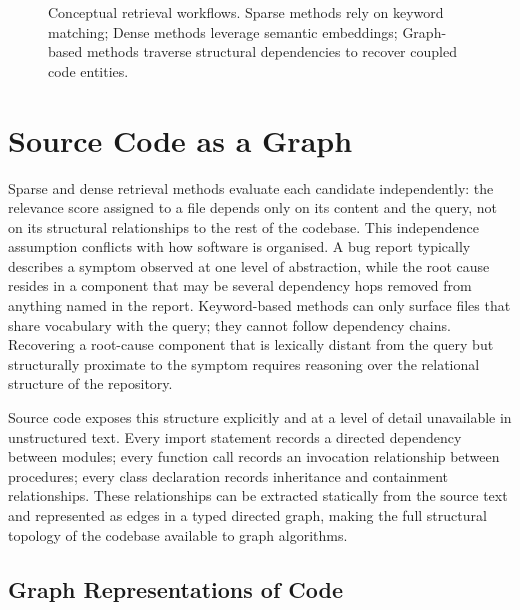 \begin{figure}[H]
    \caption{Conceptual retrieval workflows. Sparse methods rely on keyword matching; Dense methods leverage semantic embeddings; Graph-based methods traverse structural dependencies to recover coupled code entities.}
    \label{fig:retrieval-flow}
\end{figure}

\section{Source Code as a Graph}
\label{sec:code-as-graph}

Sparse and dense retrieval methods evaluate each candidate independently: the relevance
score assigned to a file depends only on its content and the query, not on its structural
relationships to the rest of the codebase.
This independence assumption conflicts with how software is organised.
A bug report typically describes a symptom observed at one level of abstraction, while
the root cause resides in a component that may be several dependency hops removed from
anything named in the report.
Keyword-based methods can only surface files that share vocabulary with the query;
they cannot follow dependency chains.
Recovering a root-cause component that is lexically distant from the query but
structurally proximate to the symptom requires reasoning over the relational structure
of the repository.

Source code exposes this structure explicitly and at a level of detail unavailable in
unstructured text.
Every import statement records a directed dependency between modules; every function
call records an invocation relationship between procedures; every class declaration
records inheritance and containment relationships.
These relationships can be extracted statically from the source text and represented as
edges in a typed directed graph, making the full structural topology of the codebase
available to graph algorithms.

\subsection{Graph Representations of Code}
\label{sec:graph-representations}

